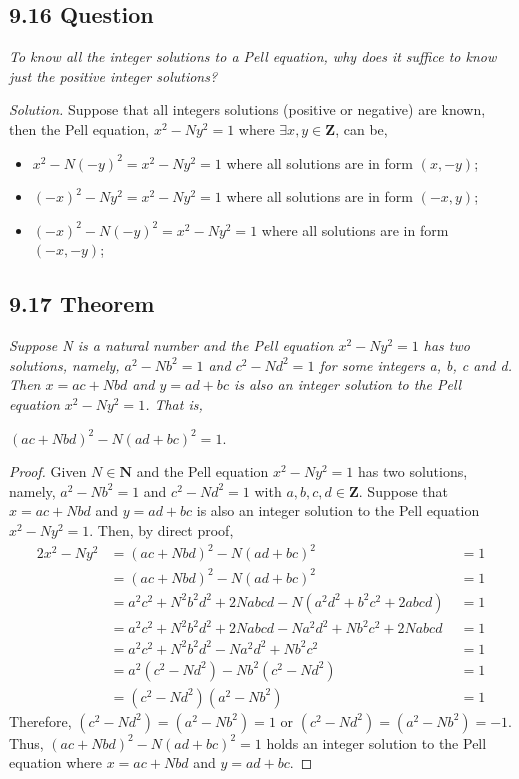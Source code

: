 \documentclass{article}
\begin{document}
\subsection*{9.16 Question} 
\quad \textit{To know all the integer solutions to a Pell equation, why does it suffice to know just the positive integer solutions?}

\textit{Solution.} Suppose that all integers solutions (positive or negative) are known, then the Pell equation, $x^2 - Ny^2 = 1$ where $\exists x, y \in \mathbf{Z}$, can be,
\begin{itemize}
    \item $x^2 - N(-y)^2 = x^2 - Ny^2 = 1$ where all solutions are in form $(x, -y)$;
    \item $(-x)^2 - Ny^2 = x^2 - Ny^2 = 1$ where all solutions are in form $(-x, y)$;    
    \item $(-x)^2 - N(-y)^2 = x^2 - Ny^2 = 1$ where all solutions are in form $(-x, -y)$;
\end{itemize}

\subsection*{9.17 Theorem} 
\quad \textit{Suppose N is a natural number and the Pell equation $x^2-Ny^2=1$ has two solutions, namely, $a^2-Nb^2=1$ and $c^2-Nd^2 = 1$ for some integers a, b, c and d. Then $x = ac + Nbd$ and $y = ad + bc$ is also an integer solution to the Pell equation $x^2-Ny^2=1$. That is,}
\begin{center}
    $(ac + Nbd)^2 - N(ad + bc)^2 = 1$.
\end{center}

\begin{proof}
Given $N \in \mathbf{N}$ and the Pell equation $x^2-Ny^2=1$ has two solutions, namely, $a^2-Nb^2=1$ and $c^2-Nd^2 = 1$ with $a, b, c, d \in \mathbf{Z}$. Suppose that $x = ac + Nbd$ and $y = ad + bc$ is also an integer solution to the Pell equation $x^2-Ny^2=1$. Then, by direct proof,
\begin{alignat*}{2}
    x^2 - Ny^2 &= (ac + Nbd)^2 - N(ad + bc)^2 \;&= 1\\
               &= (ac + Nbd)^2 - N(ad + bc)^2 \;&= 1\\
               &= a^2c^2 + N^2b^2d^2 + 2Nabcd - N(a^2d^2 + b^2c^2 + 2abcd) \;&= 1\\
               &= a^2c^2 + N^2b^2d^2 + 2Nabcd - Na^2d^2 + Nb^2c^2 + 2Nabcd \;&= 1\\
               &= a^2c^2 + N^2b^2d^2 - Na^2d^2 + Nb^2c^2 \;&= 1\\
               &= a^2(c^2-Nd^2) - Nb^2(c^2-Nd^2) \;&= 1\\
               &= (c^2-Nd^2)(a^2 - Nb^2) \;&= 1
\end{alignat*}
Therefore, $(c^2-Nd^2) = (a^2 - Nb^2) = 1$ or $(c^2-Nd^2) = (a^2 - Nb^2) = -1$. Thus, $(ac + Nbd)^2 - N(ad + bc)^2 = 1$ holds an integer solution to the Pell equation where $x = ac + Nbd$ and $y = ad + bc$.
\end{proof}
\end{document}
